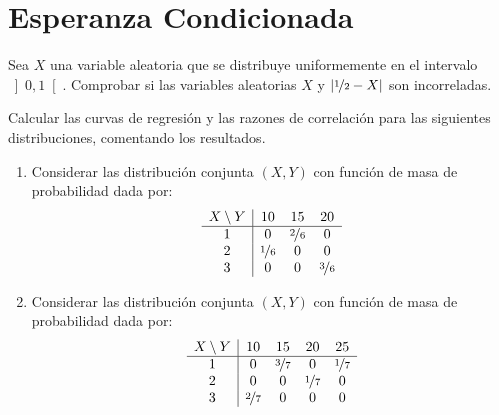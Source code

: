 \section{Esperanza Condicionada}

\begin{ejercicio}
    Sea $X$ una variable aleatoria que se distribuye uniformemente en el intervalo $\left]0,1\right[$. Comprobar si las variables aleatorias $X$ y $|\nicefrac{1}{2}-X|$ son incorreladas.
\end{ejercicio}

\begin{ejercicio}
    Calcular las curvas de regresión y las razones de correlación para las siguientes distribuciones, comentando los resultados.
    \begin{enumerate}
        \item Considerar las distribución conjunta $(X,Y)$ con función de masa de probabilidad dada por:
        \begin{equation*}
            \begin{array}{c|ccc}
                X\setminus Y & 10 & 15 & 20\\
                \hline
                1 & 0 & \nicefrac{2}{6} & 0\\
                2 & \nicefrac{1}{6} & 0 & 0\\
                3 & 0 & 0 & \nicefrac{3}{6}
            \end{array}
        \end{equation*}

        \item Considerar las distribución conjunta $(X,Y)$ con función de masa de probabilidad dada por:
        \begin{equation*}
            \begin{array}{c|cccc}
                X\setminus Y & 10 & 15 & 20 & 25\\
                \hline
                1 & 0 & \nicefrac{3}{7} & 0 & \nicefrac{1}{7}\\
                2 & 0 & 0 & \nicefrac{1}{7} & 0\\
                3 & \nicefrac{2}{7} & 0 & 0 & 0
            \end{array}
        \end{equation*}
    \end{enumerate}
\end{ejercicio}

